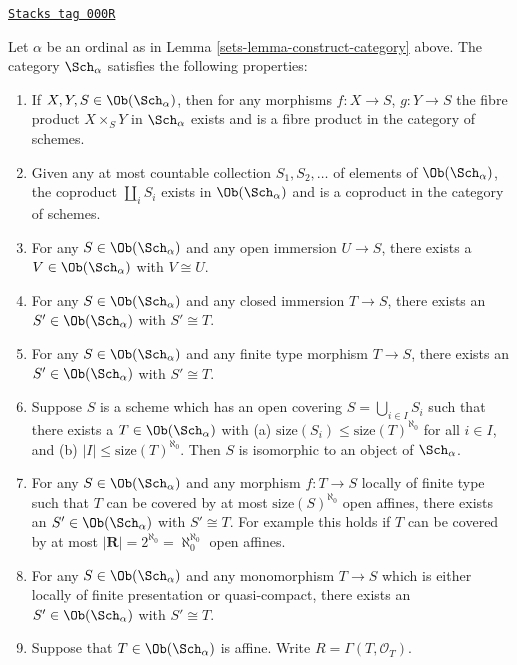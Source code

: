 \begin{lemma}[What is in it]
\label{sets-lemma-what-is-in-it}
\href{https://stacks.math.columbia.edu/tag/000R}{\texttt{Stacks tag 000R}}

Let $\alpha$ be an ordinal as in Lemma \ref{sets-lemma-construct-category} above.
The category $\Sch_\alpha$ satisfies the following
properties:
\begin{enumerate}
\item If $X, Y, S \in \Ob(\Sch_\alpha)$, then
for any morphisms $f : X \to S$, $g : Y \to S$ the fibre
product $X \times_S Y$ in $\Sch_\alpha$ exists
and is a fibre product in the category of schemes.
\item Given any at most countable collection $S_1, S_2, \ldots$
of elements of $\Ob(\Sch_\alpha)$, the coproduct
$\coprod_i S_i$ exists in $\Ob(\Sch_\alpha)$ and
is a coproduct in the category of schemes.
\item For any $S \in \Ob(\Sch_\alpha)$ and
any open immersion $U \to S$, there exists a
$V \in \Ob(\Sch_\alpha)$ with $V \cong U$.
\item For any $S \in \Ob(\Sch_\alpha)$ and
any closed immersion $T \to S$, there exists an
$S' \in \Ob(\Sch_\alpha)$ with $S' \cong T$.
\item For any $S \in \Ob(\Sch_\alpha)$ and
any finite type morphism $T \to S$, there exists an
$S' \in \Ob(\Sch_\alpha)$ with $S' \cong T$.
\item Suppose $S$ is a scheme which has an open covering
$S = \bigcup_{i \in I} S_i$ such that there exists
a $T \in \Ob(\Sch_\alpha)$ with
(a) $\text{size}(S_i) \leq \text{size}(T)^{\aleph_0}$ for all
$i \in I$, and (b) $|I| \leq \text{size}(T)^{\aleph_0}$.
Then $S$ is isomorphic to an object of $\Sch_\alpha$.
\item For any $S \in \Ob(\Sch_\alpha)$ and
any morphism $f : T \to S$ locally of finite type such
that $T$ can be covered by at most
$\text{size}(S)^{\aleph_0}$ open affines, there exists an
$S' \in \Ob(\Sch_\alpha)$ with $S' \cong T$.
For example this holds if $T$ can be covered by at most
$|\mathbf{R}| = 2^{\aleph_0} = \aleph_0^{\aleph_0}$ open affines.
\item For any $S \in \Ob(\Sch_\alpha)$ and
any monomorphism $T \to S$ which is either locally of finite presentation
or quasi-compact, there exists an
$S' \in \Ob(\Sch_\alpha)$ with $S' \cong T$.
\item Suppose that $T \in \Ob(\Sch_\alpha)$ is
affine. Write $R = \Gamma(T, \mathcal{O}_T)$.

\end{enumerate}
\end{lemma}
